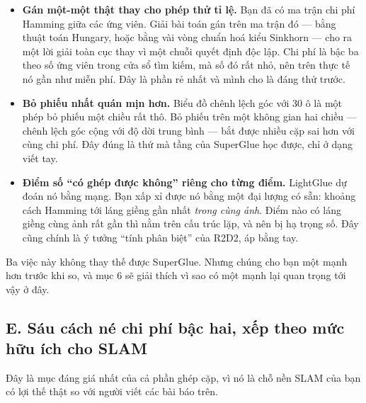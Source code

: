 \documentclass[../../deep_learning.tex]{subfiles}
\begin{document}
\begin{itemize}
\item \textbf{Gán một-một thật thay cho phép thử tỉ lệ.} Bạn đã có ma trận chi phí Hamming giữa các ứng viên. Giải bài toán gán trên ma trận đó --- bằng thuật toán Hungary, hoặc bằng vài vòng chuẩn hoá kiểu Sinkhorn --- cho ra một lời giải toàn cục thay vì một chuỗi quyết định độc lập. Chi phí là bậc ba theo số ứng viên trong cửa sổ tìm kiếm, mà số đó rất nhỏ, nên trên thực tế nó gần như miễn phí. Đây là phần rẻ nhất và mình cho là đáng thử trước.
\item \textbf{Bỏ phiếu nhất quán mịn hơn.} Biểu đồ chênh lệch góc với 30 ô là một phép bỏ phiếu một chiều rất thô. Bỏ phiếu trên một không gian hai chiều --- chênh lệch góc cộng với độ dời trung bình --- bắt được nhiều cặp sai hơn với cùng chi phí. Đây đúng là thứ mà tầng  của SuperGlue học được, chỉ ở dạng viết tay.
\item \textbf{Điểm số ``có ghép được không'' riêng cho từng điểm.} LightGlue dự đoán nó bằng mạng. Bạn xấp xỉ được nó bằng một đại lượng có sẵn: khoảng cách Hamming tới láng giềng gần nhất \emph{trong cùng ảnh}. Điểm nào có láng giềng cùng ảnh rất gần thì nằm trên cấu trúc lặp, và nên bị hạ trọng số. Đây cũng chính là ý tưởng ``tính phân biệt'' của R2D2, áp bằng tay.
\end{itemize}

Ba việc này không thay thế được SuperGlue. Nhưng chúng cho bạn một  mạnh hơn trước khi so, và mục 6 sẽ giải thích vì sao có một  mạnh lại quan trọng tới vậy ở đây.

\subsection{E. Sáu cách né chi phí bậc hai, xếp theo mức hữu ích cho SLAM}
Đây là mục đáng giá nhất của cả phần ghép cặp, vì nó là chỗ nền SLAM của bạn có lợi thế thật so với người viết các bài báo trên.
\end{document}
